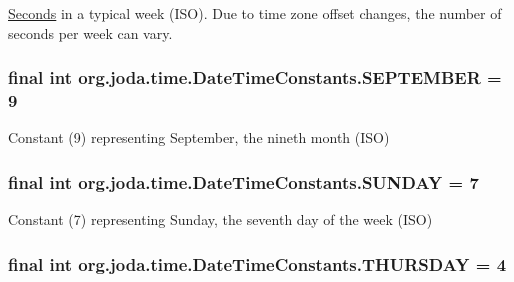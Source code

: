 \hyperlink{classorg_1_1joda_1_1time_1_1_seconds}{Seconds} in a typical week (I\-S\-O). Due to time zone offset changes, the number of seconds per week can vary. \hypertarget{classorg_1_1joda_1_1time_1_1_date_time_constants_ae7a1485172a8c28d924b9c147a4ec514}{
\subsubsection[{S\-E\-P\-T\-E\-M\-B\-E\-R}]{\setlength{\rightskip}{0pt plus 5cm}final int org.\-joda.\-time.\-Date\-Time\-Constants.\-S\-E\-P\-T\-E\-M\-B\-E\-R = 9\hspace{0.3cm}{\ttfamily [static]}}}\label{classorg_1_1joda_1_1time_1_1_date_time_constants_ae7a1485172a8c28d924b9c147a4ec514}
Constant (9) representing September, the nineth month (I\-S\-O) \hypertarget{classorg_1_1joda_1_1time_1_1_date_time_constants_a57ac0e5b9df975553c2bc85cfb119144}{
\subsubsection[{S\-U\-N\-D\-A\-Y}]{\setlength{\rightskip}{0pt plus 5cm}final int org.\-joda.\-time.\-Date\-Time\-Constants.\-S\-U\-N\-D\-A\-Y = 7\hspace{0.3cm}{\ttfamily [static]}}}\label{classorg_1_1joda_1_1time_1_1_date_time_constants_a57ac0e5b9df975553c2bc85cfb119144}
Constant (7) representing Sunday, the seventh day of the week (I\-S\-O) \hypertarget{classorg_1_1joda_1_1time_1_1_date_time_constants_a01b49424a9c6b92a992f400557ba62be}{
\subsubsection[{T\-H\-U\-R\-S\-D\-A\-Y}]{\setlength{\rightskip}{0pt plus 5cm}final int org.\-joda.\-time.\-Date\-Time\-Constants.\-T\-H\-U\-R\-S\-D\-A\-Y = 4\hspace{0.3cm}{\ttfamily [static]}}}\label{classorg_1_1joda_1_1time_1_1_date_time_constants_a01b49424a9c6b92a992f400557ba62be}
